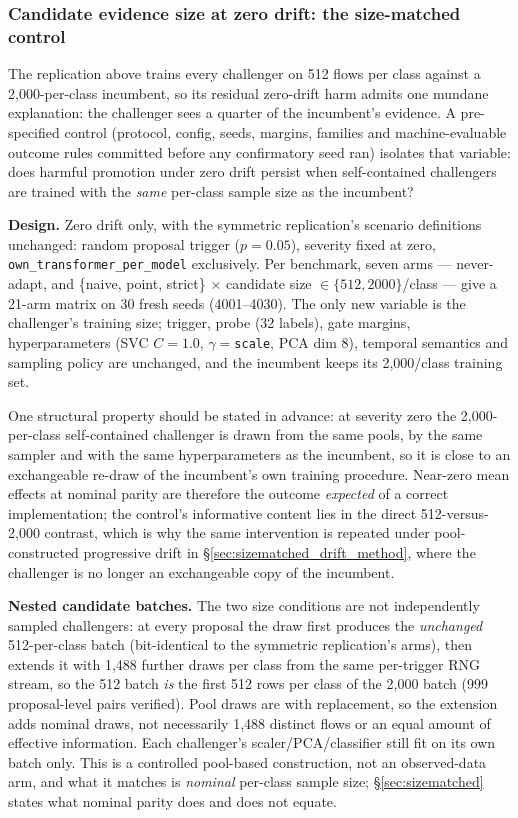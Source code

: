 \documentclass[journal]{IEEEtran}
\begin{document}
\subsubsection{Candidate evidence size at zero drift: the size-matched control}
\label{sec:sizematched_method}

The replication above trains every challenger on 512 flows per class against a 2{,}000-per-class incumbent, so its residual zero-drift harm admits one mundane explanation: the challenger sees a quarter of the incumbent's evidence. A pre-specified control (protocol, config, seeds, margins, families and machine-evaluable outcome rules committed before any confirmatory seed ran) isolates that variable: does harmful promotion under zero drift persist when self-contained challengers are trained with the \emph{same} per-class sample size as the incumbent?

\textbf{Design.} Zero drift only, with the symmetric replication's scenario definitions unchanged: random proposal trigger ($p{=}0.05$), severity fixed at zero, \texttt{own\_transformer\_per\_model} exclusively. Per benchmark, seven arms --- never-adapt, and \{naive, point, strict\} $\times$ candidate size $\in \{512, 2000\}$/class --- give a 21-arm matrix on 30 fresh seeds (4001--4030). The only new variable is the challenger's training size; trigger, probe (32 labels), gate margins, hyperparameters (SVC $C{=}1.0$, $\gamma{=}$\texttt{scale}, PCA dim 8), temporal semantics and sampling policy are unchanged, and the incumbent keeps its 2{,}000/class training set.

One structural property should be stated in advance: at severity zero the 2{,}000-per-class self-contained challenger is drawn from the same pools, by the same sampler and with the same hyperparameters as the incumbent, so it is close to an exchangeable re-draw of the incumbent's own training procedure. Near-zero mean effects at nominal parity are therefore the outcome \emph{expected} of a correct implementation; the control's informative content lies in the direct 512-versus-2{,}000 contrast, which is why the same intervention is repeated under pool-constructed progressive drift in \S\ref{sec:sizematched_drift_method}, where the challenger is no longer an exchangeable copy of the incumbent.

\textbf{Nested candidate batches.} The two size conditions are not independently sampled challengers: at every proposal the draw first produces the \emph{unchanged} 512-per-class batch (bit-identical to the symmetric replication's arms), then extends it with 1{,}488 further draws per class from the same per-trigger RNG stream, so the 512 batch \emph{is} the first 512 rows per class of the 2{,}000 batch (999 proposal-level pairs verified). Pool draws are with replacement, so the extension adds nominal draws, not necessarily 1{,}488 distinct flows or an equal amount of effective information. Each challenger's scaler/PCA/classifier still fit on its own batch only. This is a controlled pool-based construction, not an observed-data arm, and what it matches is \emph{nominal} per-class sample size; \S\ref{sec:sizematched} states what nominal parity does and does not equate.
\end{document}
